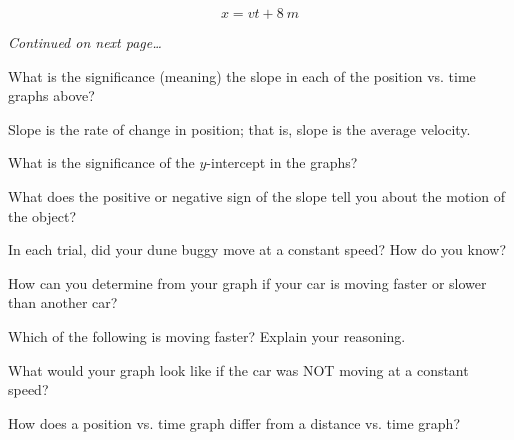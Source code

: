\documentclass[]{exam}
\begin{document}
\begin{questions}
\begin{parts}
\ifprintanswers
{\color{red}
\begin{equation*}
    x = vt + \SI{8}{m}
\end{equation*}
}
\fi

\ifprintanswers
\else
\fillwithlines{1cm}

\hfill \textit{Continued on next page\ldots}
\fi
\end{parts}

\ifprintanswers
\else
\clearpage
\fi

\question
What is the significance (meaning) the slope in each of the position vs. time graphs above?

\ifprintanswers
\else
\fillwithlines{2cm}
\fi

\begin{solution}
    Slope is the rate of change in position; that is, slope is the average velocity.
\end{solution}

\question
What is the significance of the $y$-intercept in the graphs?

\fillwithlines{1.5cm}

\question
What does the positive or negative sign of the slope tell you about the motion of the object?

\fillwithlines{1.5cm}

\question
In each trial, did your dune buggy move at a constant speed? How do you know?

\fillwithlines{1.5cm}

\question
How can you determine from your graph if your car is moving faster or slower than another car?

\fillwithlines{1.5cm}

\question
Which of the following is moving faster? Explain your reasoning.

\begin{center}
\hspace{2cm}
\end{center}

\fillwithlines{2cm}

\question
What would your graph look like if the car was NOT moving at a constant speed?

\fillwithlines{1.5cm}

\question
How does a position vs. time graph differ from a distance vs.
time graph?

\fillwithlines{2cm}

\end{questions}
\end{document}
